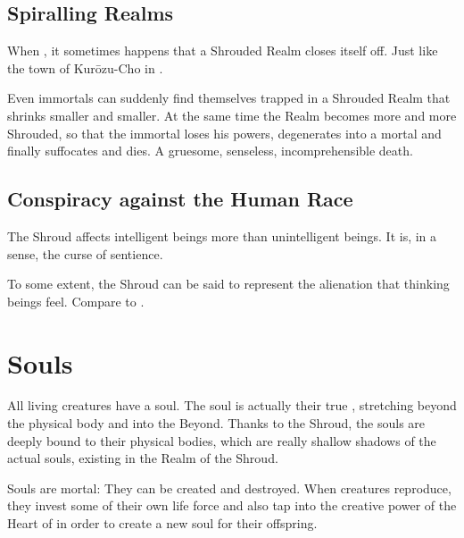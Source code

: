 \subsection{Spiralling Realms}
When , it sometimes happens that a Shrouded Realm closes itself off. 
Just like the town of Kur\=ozu-Cho in \cite{ItoJunji:Uzumaki}. 

Even immortals can suddenly find themselves trapped in a Shrouded Realm that shrinks smaller and smaller.
At the same time the Realm becomes more and more Shrouded, so that the immortal loses his powers, degenerates into a mortal and finally suffocates and dies.
A gruesome, senseless, incomprehensible death.









\subsection{Conspiracy against the Human Race}
The Shroud affects intelligent beings more than unintelligent beings. 
It is, in a sense, the curse of sentience. 

To some extent, the Shroud can be said to represent the alienation that thinking beings feel. 
Compare to \cite{ThomasLigotti:TheConspiracyAgainsttheHumanRace}. 















\section{Souls}
All living creatures have a soul. The soul is actually their true , stretching beyond the physical body and into the Beyond. Thanks to the Shroud, the souls are deeply bound to their physical bodies, which are really shallow shadows of the actual souls, existing in the Realm of the Shroud. 

Souls are mortal: They can be created and destroyed. When \Miithian{} creatures reproduce, they invest some of their own life force and also tap into the creative power of the Heart of \Miith{} in order to create a new soul for their offspring. 

